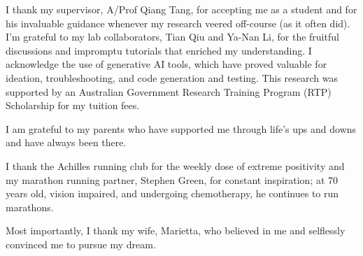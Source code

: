 I thank my supervisor, A/Prof Qiang Tang, for accepting me as a student and for his invaluable guidance whenever my research veered off-course (as it often did). I'm grateful to my lab collaborators, Tian Qiu and Ya-Nan Li, for the fruitful discussions and impromptu tutorials that enriched my understanding. I acknowledge the use of generative AI tools, which have proved valuable for ideation, troubleshooting, and code generation and testing. This research was supported by an Australian Government Research Training Program (RTP) Scholarship for my tuition fees.

I am grateful to my parents who have supported me through life's ups and downs and have always been there.

I thank the Achilles running club for the weekly dose of extreme positivity and my marathon running partner, Stephen Green, for constant inspiration; at 70 years old, vision impaired, and undergoing chemotherapy, he continues to run marathons. 

Most importantly, I thank my wife, Marietta, who believed in me and selflessly convinced me to pursue my dream.